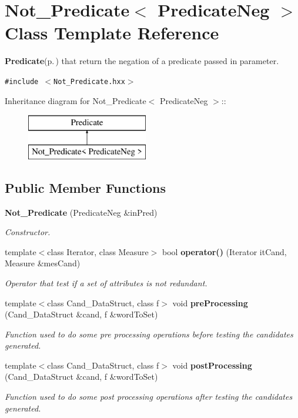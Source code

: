 \section{Not\_\-Predicate$<$ Predicate\-Neg $>$ Class Template Reference}
\label{class_not___predicate}
{\bf Predicate}{\rm (p.\,\pageref{class_predicate})} that return the negation of a predicate passed in parameter.  


{\tt \#include $<$Not\_\-Predicate.hxx$>$}

Inheritance diagram for Not\_\-Predicate$<$ Predicate\-Neg $>$::\begin{figure}[H]
\begin{center}
\leavevmode
\includegraphics[height=2cm]{class_not___predicate}
\end{center}
\end{figure}
\subsection*{Public Member Functions}
\begin{CompactItemize}
\item 
{\bf Not\_\-Predicate} (Predicate\-Neg \&in\-Pred)\label{class_not___predicate_48a08a2ead6b824a9fec80c3610ccba7}

\begin{CompactList}\small\item\em Constructor. \item\end{CompactList}\item 
template$<$class Iterator, class Measure$>$ bool {\bf operator()} (Iterator it\-Cand, Measure \&mes\-Cand)\label{class_not___predicate_c4dd938a356c8476e50806158069d169}

\begin{CompactList}\small\item\em Operator that test if a set of attributes is not redundant. \item\end{CompactList}\item 
template$<$class Cand\_\-Data\-Struct, class f$>$ void {\bf pre\-Processing} (Cand\_\-Data\-Struct \&cand, f \&word\-To\-Set)
\begin{CompactList}\small\item\em Function used to do some pre processing operations before testing the candidates generated. \item\end{CompactList}\item 
template$<$class Cand\_\-Data\-Struct, class f$>$ void {\bf post\-Processing} (Cand\_\-Data\-Struct \&cand, f \&word\-To\-Set)
\begin{CompactList}\small\item\em Function used to do some post processing operations after testing the candidates generated. \item\end{CompactList}\end{CompactItemize}
